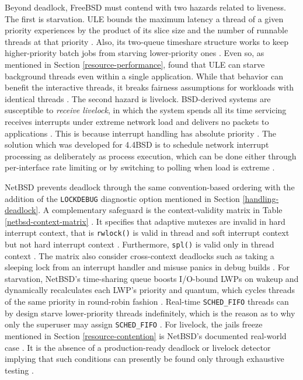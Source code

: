 Beyond deadlock, FreeBSD must contend with two hazards related to liveness. The first is starvation. ULE bounds the maximum latency a
thread of a given priority experiences by the product of its slice size and the number of runnable threads at that priority
\parencite{mckusick2014_process}. Also, its two-queue timeshare structure works to keep higher-priority batch jobs from starving
lower-priority ones \parencite{mckusick2014_process}. Even so, as mentioned in Section \ref{resource-performance},
\textcite{bouron2018} found that ULE can starve background threads even within a single application. While that behavior can benefit
the interactive threads, it breaks fairness assumptions for workloads with identical threads \parencite{bouron2018}. The
second hazard is livelock. BSD-derived systems are susceptible to \textit{receive livelock}, in which the system spends
all its time servicing receives interrupts under extreme network load and delivers no packets to applications \parencite{mogul1996}.
This is because interrupt handling has absolute priority \parencite{mogul1996}. The solution which was developed for 4.4BSD
is to schedule network interrupt processing as deliberately as process execution, which can be done either through per-interface
rate limiting or by switching to polling when load is extreme \parencite{mogul1996}.

NetBSD prevents deadlock through the same convention-based ordering with the addition of the \texttt{LOCKDEBUG} diagnostic option
mentioned in Section \ref{handling-deadlock}. A complementary safeguard is the context-validity matrix in Table
\ref{netbsd-context-matrix} \parencite{netbsd_locking}. It specifies that adaptive mutexes are invalid in hard interrupt context,
that is \texttt{rwlock()} is valid in thread and soft interrupt context but not hard interrupt context \parencite{netbsd_locking}.
Furthermore, \texttt{spl()} is valid only in thread context \parencite{netbsd_locking}. The matrix also consider cross-context
deadlocks such as taking a sleeping lock from an interrupt handler and misuse panics in debug builds \parencite{netbsd_locking}.
For starvation, NetBSD's time-sharing queue boosts I/O-bound LWPs on wakeup and dynamically recalculates each LWP's priority and
quantum, which cycles threads of the same priority in round-robin fashion \parencite{rasiukevicius2009}. Real-time
\texttt{SCHED\_FIFO} threads can by design starve lower-priority threads indefinitely, which is the reason as to why only the
superuser may assign \texttt{SCHED\_FIFO} \parencite{rasiukevicius2009}. For livelock, the jails freeze mentioned in Section
\ref{resource-contention} is NetBSD's documented real-world case \parencite{petermann_jails}. It is the absence of a
production-ready deadlock or livelock detector implying that such conditions can presently be found
only through exhaustive testing \parencite{petermann_jails}.

